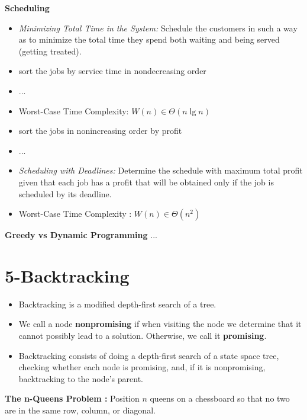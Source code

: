 \documentclass{../cheat}
\begin{document}
\begin{multicols}{3}
	\textbf{Scheduling}
	\begin{itemize}
		\item \textit{Minimizing Total Time in the System:} Schedule the customers in such a way as to minimize the total time they spend both waiting and being served (getting treated).
		\item sort the jobs by service time in nondecreasing order
		\item ...
		\item Worst-Case Time Complexity: $W(n) \in \Theta(n \;\text{lg}\; n)$
		\item sort the jobs in nonincreasing order by profit
		\item ...
		\item \textit{Scheduling with Deadlines:} Determine the schedule with maximum total profit given that each job has a profit that will be obtained only if the job is scheduled by its deadline. 
		\item Worst-Case Time Complexity : $W(n) \in \Theta(n^2)$
	\end{itemize}
	
	\textbf{Greedy vs Dynamic Programming} ...
	
	
\section{5-Backtracking}
	\begin{itemize}
		\item Backtracking is a modified depth-first search of a tree.
		\item We call a node \textbf{nonpromising} if when visiting the node we determine that it cannot possibly lead to a solution. Otherwise, we call it \textbf{promising}. 
		\item Backtracking consists of doing a depth-first search of a state space tree, checking whether each node is promising, and, if it is nonpromising, backtracking to the node's parent.
	\end{itemize}
	
	\textbf{The n-Queens Problem :}
	Position $n$ queens on a chessboard so that no two are in the same row, column, or diagonal. 
 

\end{multicols}
\end{document}
